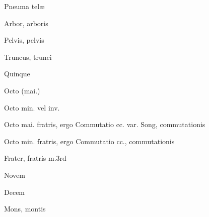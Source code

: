  {\mktsStyleItalic{}Pneuma telæ\/}




 {\mktsStyleItalic{}Arbor\/}, arboris


 {\mktsStyleItalic{}Pelvis\/}, pelvis


 {\mktsStyleItalic{}Truncus\/}, trunci


 {\mktsStyleItalic{}Quinque\/}


 {\mktsStyleItalic{}Octo (mai.)\/}


 {\mktsStyleItalic{}Octo min.\/} vel {\mktsStyleItalic{}inv.\/}


 {\mktsStyleItalic{}Octo mai. fratris\/}, ergo {\mktsStyleItalic{}Commutatio cc.\/} var. {\mktsStyleItalic{}Song\/}, commutationis


 {\mktsStyleItalic{}Octo min. fratris\/}, ergo {\mktsStyleItalic{}Commutatio cc.\/}, commutationis


 {\mktsStyleItalic{}Frater\/}, fratris {\mktsStyleItalic{}m.3rd\/}


 {\mktsStyleItalic{}Novem\/}


 {\mktsStyleItalic{}Decem\/}


 {\mktsStyleItalic{}Mons\/}, montis


